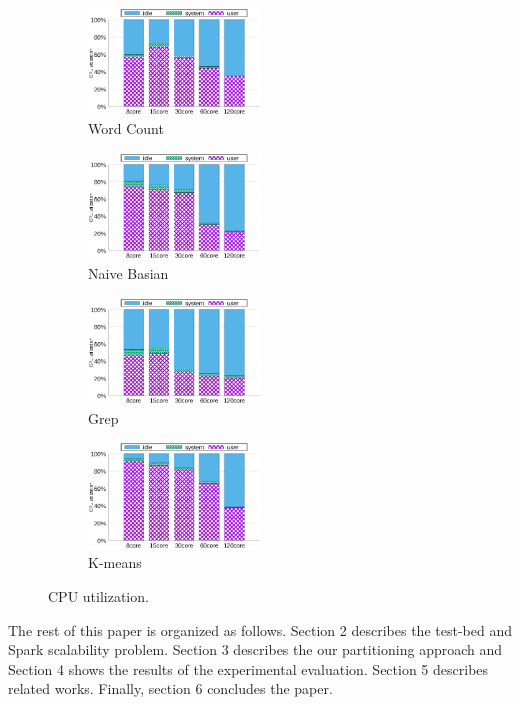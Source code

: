 \begin{figure}[tb]
    \centering
    \begin{subfigure}[b]{0.25\textwidth}
        \includegraphics[width=1.8in]{graph/wc_cpuutils.eps}
        \caption{Word Count}
    \end{subfigure}%
    \begin{subfigure}[b]{0.25\textwidth}
        \includegraphics[width=1.8in]{graph/nb_cpuutils.eps}
        \caption{Naive Basian}
    \end{subfigure}%
    \begin{subfigure}[b]{0.25\textwidth}
        \includegraphics[width=1.8in]{graph/grep_cpuutils.eps}
        \caption{Grep}
    \end{subfigure}%
    \begin{subfigure}[b]{0.25\textwidth}
        \includegraphics[width=1.8in]{graph/kmeans_cpuutils.eps}
        \caption{K-means}
    \end{subfigure}%
        \centering
    \caption{CPU utilization.}
    \label{fig:cpuutilization}
\end{figure}

The rest of this paper is organized as follows.
Section 2 describes the test-bed and Spark scalability problem.
Section 3 describes the our partitioning approach and 
Section 4 shows the results of the experimental evaluation. 
Section 5 describes related works. 
Finally, section 6 concludes the paper.


